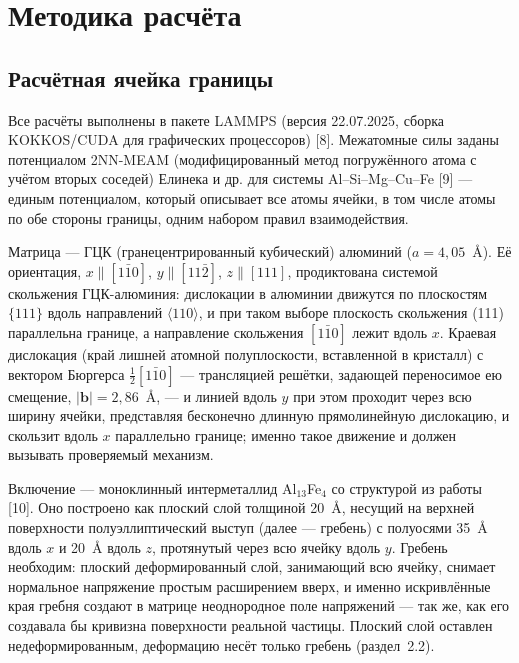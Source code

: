 \section{Методика расчёта}

\subsection{Расчётная ячейка границы}

Все расчёты выполнены в пакете LAMMPS (версия 22.07.2025, сборка
KOKKOS\slash CUDA для графических процессоров) [8]. Межатомные силы заданы
потенциалом 2NN-MEAM (модифицированный метод погружённого атома с учётом
вторых соседей) Елинека и др. для системы Al--Si--Mg--Cu--Fe [9] --- единым
потенциалом, который описывает все атомы ячейки, в том числе атомы по обе
стороны границы, одним набором правил взаимодействия.

Матрица --- ГЦК (гранецентрированный кубический) алюминий
($a = 4{,}05$~\AA{}). Её ориентация, $x\parallel[1\bar{1}0]$,
$y\parallel[11\bar{2}]$, $z\parallel[111]$, продиктована системой скольжения
ГЦК-алюминия: дислокации в алюминии движутся по плоскостям $\{111\}$ вдоль
направлений $\langle110\rangle$, и при таком выборе плоскость скольжения
(111) параллельна границе, а направление скольжения $[1\bar{1}0]$ лежит
вдоль $x$. Краевая дислокация (край лишней атомной полуплоскости, вставленной
в кристалл) с вектором Бюргерса $\tfrac{1}{2}[1\bar{1}0]$ --- трансляцией
решётки, задающей переносимое ею смещение, $|\mathbf{b}| = 2{,}86$~\AA{}, ---
и линией вдоль $y$ при этом проходит через всю ширину ячейки, представляя
бесконечно длинную прямолинейную дислокацию, и скользит вдоль $x$
параллельно границе; именно такое движение и должен вызывать проверяемый
механизм.

Включение --- моноклинный интерметаллид Al$_{13}$Fe$_4$ со структурой из
работы [10]. Оно построено как плоский слой толщиной 20~\AA{}, несущий на
верхней поверхности полуэллиптический выступ (далее --- гребень) с полуосями
35~\AA{} вдоль $x$ и 20~\AA{} вдоль $z$, протянутый через всю ячейку вдоль
$y$. Гребень необходим: плоский деформированный слой, занимающий всю ячейку,
снимает нормальное напряжение простым расширением вверх, и именно
искривлённые края гребня создают в матрице неоднородное поле напряжений ---
так же, как его создавала бы кривизна поверхности реальной частицы. Плоский слой оставлен недеформированным, деформацию несёт только гребень
(раздел~2.2).

